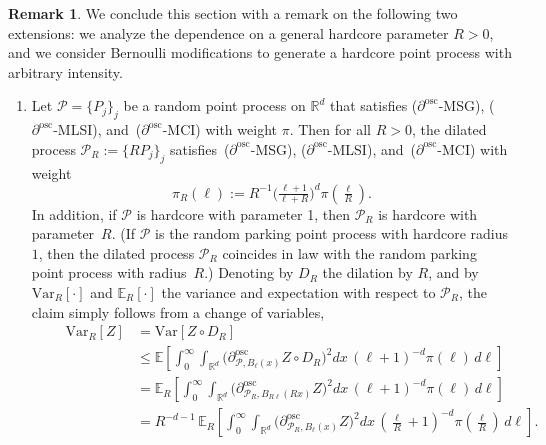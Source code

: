 \documentclass[11pt]{article}
\theoremstyle{definition}
\newtheorem{rema}[theo]{Remark}
\numberwithin{equation}{section}
\numberwithin{figure}{section}
\numberwithin{table}{section}
\newcommand{\R}{\mathbb R}
\newcommand{\expecR}[1]{\mathbb{E}_R\left[#1 \right]}
\newcommand{\expec}[1]{\mathbb{E}\left[#1 \right]}
\newcommand{\Pc}{\mathcal P}
\newcommand{\osc}{\partial^{\mathrm{osc}}}
\newcommand{\oscd}[1]{\mathrel{\osc_{#1}}}
\newcommand{\var}[1]{\mathrm{Var}\left[#1\right]}
\newcommand{\varR}[1]{\mathrm{Var}_R\left[#1\right]}
\newcommand*{\alphenumi}{\renewcommand*{\theenumi}{\alph{enumi}}}
\begin{document}
\begin{rema}\label{lem:general-hardcore/decimated}
We conclude this section with a remark on the following two extensions: we analyze the dependence on a general hardcore parameter $R>0$, and we consider Bernoulli modifications to generate a hardcore point process with arbitrary intensity.
\begin{enumerate}\alphenumi
\item \label{rema3.4.1} Let $\Pc=\{P_j\}_j$ be a random point process on $\R^d$ that satisfies {($\osc$-MSG)}, {($\osc$-MLSI)}, and~{($\osc$-MCI)} with weight $\pi$. Then for all $R>0$, the dilated process $\Pc_R:=\{RP_j\}_j$ satisfies~{($\osc$-MSG)}, {($\osc$-MLSI)}, and~{($\osc$-MCI)} with weight
\[
\pi_R(\ell):= R^{-1} \big(\tfrac{\ell+1} {\ell+ R}\big)^{d}\pi(\tfrac \ell R).
\]
In addition, if $\Pc$ is hardcore with parameter 1, then $\Pc_R$ is hardcore with parameter~$R$. (If $\Pc$ is the random parking point process with hardcore radius $1$, then the dilated process $\Pc_R$ coincides in law with the random parking point process with radius~$R$.) Denoting by $D_R$ the dilation by $R$, and by $\varR{\cdot}$ and $\expecR{\cdot}$ the variance and expectation with respect to $\Pc_R$, the claim simply follows from a change of variables,
\begin{align*}
\qquad\varR{Z}&=\var{Z\circ D_R}\\
&\le \expec{\int_0^\infty\int_{\R^d} \Big(\oscd{\Pc,B_\ell(x)}Z\circ D_R\Big)^2dx\,(\ell+1)^{-d} \pi(\ell)\,d\ell}
\\
&=\expecR{\int_0^\infty\int_{\R^d} \Big(\oscd{\Pc_R,B_{R\ell}(Rx)}Z\Big)^2dx\, (\ell+1)^{-d} \pi(\ell)\,d\ell}
\\
&=R^{-d-1}\,\expecR{\int_0^\infty\int_{\R^d} \Big(\oscd{\Pc_R,B_{\ell}(x)}Z\Big)^2dx\, (\tfrac\ell R+1)^{-d} \pi(\tfrac\ell R)\,d\ell}.
\end{align*}


\end{enumerate}
\end{rema}
\end{document}
